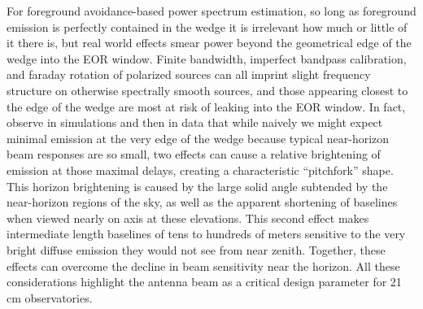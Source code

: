 \documentclass{emulateapj}
\begin{document}

For foreground avoidance-based power spectrum estimation, so long as foreground emission is perfectly contained in the wedge it is irrelevant how much or 
little of it there is, but real world effects smear power beyond the geometrical edge of the wedge into the EOR 
window. Finite bandwidth, imperfect bandpass calibration, and faraday rotation of polarized sources can all imprint slight frequency structure on otherwise spectrally smooth sources, and those appearing closest to the edge of the wedge are 
most at risk of leaking into the EOR window. In fact, 
\citet{nithya15,nithya15b} observe in simulations and then in data that while naively we might expect minimal emission 
at the very edge of the wedge because typical near-horizon beam responses are so small, 
two effects can cause a relative brightening of emission at those maximal delays, creating a characteristic ``pitchfork'' shape. This horizon 
brightening is caused by the large solid angle subtended by the near-horizon regions of the 
sky, as well as the apparent shortening of baselines when viewed nearly on axis at these elevations. 
This second effect makes intermediate length baselines of tens to hundreds of meters sensitive to the very bright diffuse 
emission they would not see from near zenith. Together, these effects can overcome the decline in beam sensitivity near the horizon. 
All these considerations highlight the antenna beam as a critical design parameter for 
21\,cm observatories.
\end{document}
